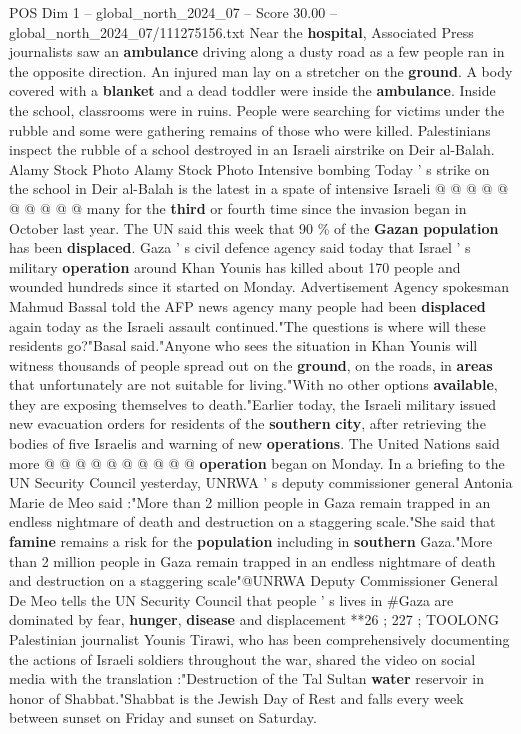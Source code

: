 \begin{textsample}{POS Dim 1 – global\_north\_2024\_07 – Score 30.00 – global\_north\_2024\_07/111275156.txt}
Near the \textbf{hospital}, Associated Press journalists saw an \textbf{ambulance} driving along a dusty road as a few people ran in the opposite direction.
An injured man lay on a stretcher on the \textbf{ground}.
A body covered with a \textbf{blanket} and a dead toddler were inside the \textbf{ambulance}.
Inside the school, classrooms were in ruins.
People were searching for victims under the rubble and some were gathering remains of those who were killed.
Palestinians inspect the rubble of a school destroyed in an Israeli airstrike on Deir al-Balah.
Alamy Stock Photo Alamy Stock Photo Intensive bombing Today ' s strike on the school in Deir al-Balah is the latest in a spate of intensive Israeli @ @ @ @ @ @ @ @ @ @ many for the \textbf{third} or fourth time since the invasion began in October last year.
The UN said this week that 90 \% of the \textbf{Gazan} \textbf{population} has been \textbf{displaced}.
Gaza ' s civil defence agency said today that Israel ' s military \textbf{operation} around Khan Younis has killed about 170 people and wounded hundreds since it started on Monday.
Advertisement Agency spokesman Mahmud Bassal told the AFP news agency many people had been \textbf{displaced} again today as the Israeli assault continued."The questions is where will these residents go?"Basal said."Anyone who sees the situation in Khan Younis will witness thousands of people spread out on the \textbf{ground}, on the roads, in \textbf{areas} that unfortunately are not suitable for living."With no other options \textbf{available}, they are exposing themselves to death."Earlier today, the Israeli military issued new evacuation orders for residents of the \textbf{southern} \textbf{city}, after retrieving the bodies of five Israelis and warning of new \textbf{operations}.
The United Nations said more @ @ @ @ @ @ @ @ @ @ \textbf{operation} began on Monday.
In a briefing to the UN Security Council yesterday, UNRWA ' s deputy commissioner general Antonia Marie de Meo said :"More than 2 million people in Gaza remain trapped in an endless nightmare of death and destruction on a staggering scale."She said that \textbf{famine} remains a risk for the \textbf{population} including in \textbf{southern} Gaza."More than 2 million people in Gaza remain trapped in an endless nightmare of death and destruction on a staggering scale"@UNRWA Deputy Commissioner General De Meo tells the UN Security Council that people ' s lives in \#Gaza are dominated by fear, \textbf{hunger}, \textbf{disease} and displacement **26 ; 227 ; TOOLONG Palestinian journalist Younis Tirawi, who has been comprehensively documenting the actions of Israeli soldiers throughout the war, shared the video on social media with the translation :"Destruction of the Tal Sultan \textbf{water} reservoir in honor of Shabbat."Shabbat is the Jewish Day of Rest and falls every week between sunset on Friday and sunset on Saturday.

\end{textsample}
